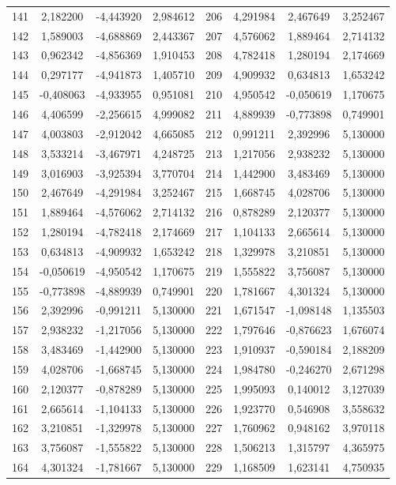 \begin{apendicesenv}
\begin{table}[H]
\begin{tabular}{c c c c c c c c}
		141 & 2,182200 & -4,443920 & 2,984612 & 206 & 4,291984 & 2,467649 & 3,252467 \\
		142 & 1,589003 & -4,688869 & 2,443367 & 207 & 4,576062 & 1,889464 & 2,714132 \\
		143 & 0,962342 & -4,856369 & 1,910453 & 208 & 4,782418 & 1,280194 & 2,174669 \\
		144 & 0,297177 & -4,941873 & 1,405710 & 209 & 4,909932 & 0,634813 & 1,653242 \\
		145 & -0,408063 & -4,933955 & 0,951081 & 210 & 4,950542 & -0,050619 & 1,170675 \\
		146 & 4,406599 & -2,256615 & 4,999082 & 211 & 4,889939 & -0,773898 & 0,749901 \\
		147 & 4,003803 & -2,912042 & 4,665085 & 212 & 0,991211 & 2,392996 & 5,130000 \\
		148 & 3,533214 & -3,467971 & 4,248725 & 213 & 1,217056 & 2,938232 & 5,130000 \\
		149 & 3,016903 & -3,925394 & 3,770704 & 214 & 1,442900 & 3,483469 & 5,130000 \\
		150 & 2,467649 & -4,291984 & 3,252467 & 215 & 1,668745 & 4,028706 & 5,130000 \\
		151 & 1,889464 & -4,576062 & 2,714132 & 216 & 0,878289 & 2,120377 & 5,130000 \\
		152 & 1,280194 & -4,782418 & 2,174669 & 217 & 1,104133 & 2,665614 & 5,130000 \\
		153 & 0,634813 & -4,909932 & 1,653242 & 218 & 1,329978 & 3,210851 & 5,130000 \\
		154 & -0,050619 & -4,950542 & 1,170675 & 219 & 1,555822 & 3,756087 & 5,130000 \\
		155 & -0,773898 & -4,889939 & 0,749901 & 220 & 1,781667 & 4,301324 & 5,130000 \\
		156 & 2,392996 & -0,991211 & 5,130000 & 221 & 1,671547 & -1,098148 & 1,135503 \\
		157 & 2,938232 & -1,217056 & 5,130000 & 222 & 1,797646 & -0,876623 & 1,676074 \\
		158 & 3,483469 & -1,442900 & 5,130000 & 223 & 1,910937 & -0,590184 & 2,188209 \\
		159 & 4,028706 & -1,668745 & 5,130000 & 224 & 1,984780 & -0,246270 & 2,671298 \\
		160 & 2,120377 & -0,878289 & 5,130000 & 225 & 1,995093 & 0,140012 & 3,127039 \\
		161 & 2,665614 & -1,104133 & 5,130000 & 226 & 1,923770 & 0,546908 & 3,558632 \\
		162 & 3,210851 & -1,329978 & 5,130000 & 227 & 1,760962 & 0,948162 & 3,970118 \\
		163 & 3,756087 & -1,555822 & 5,130000 & 228 & 1,506213 & 1,315797 & 4,365975 \\
		164 & 4,301324 & -1,781667 & 5,130000 & 229 & 1,168509 & 1,623141 & 4,750935 \\
		\bottomrule
	\end{tabular}
\end{table}


\end{apendicesenv}
